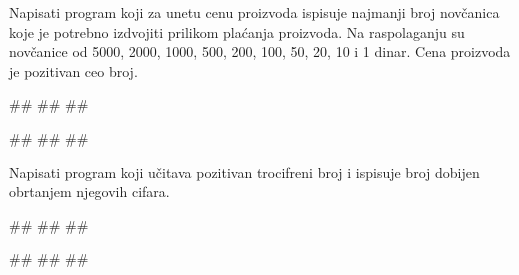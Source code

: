 \begin{Exercise}[label=UZ_NI_11] 
Napisati program koji za unetu cenu proizvoda ispisuje najmanji broj novčanica koje je potrebno izdvojiti
prilikom plaćanja proizvoda. Na raspolaganju su novčanice od 5000, 2000, 1000, 500, 200, 100, 50, 20, 10 i 1 dinar. 
Cena proizvoda je pozitivan ceo broj. 

\begin{maxitest}
\begin{upotreba}{1}
#\naslovInt#
##
##
\end{upotreba}
\begin{upotreba}{2}
#\naslovInt#
##
##
\end{upotreba}
\end{maxitest}
\end{Exercise}
\ifresenja
\begin{Answer}[ref=UZ_NI_11]
\end{Answer}
\fi


\begin{Exercise}[label=UZ_NI_12] 
Napisati program koji učitava pozitivan trocifreni broj i ispisuje broj dobijen obrtanjem njegovih cifara. 

\begin{miditest}
\begin{upotreba}{1}
#\naslovInt#
##
##
\end{upotreba}
\end{miditest}
\begin{miditest}
\begin{upotreba}{2}
#\naslovInt#
##
##
\end{upotreba}
\end{miditest}


\end{Exercise}
\ifresenja
\begin{Answer}[ref=UZ_NI_12]
\end{Answer}
\fi


